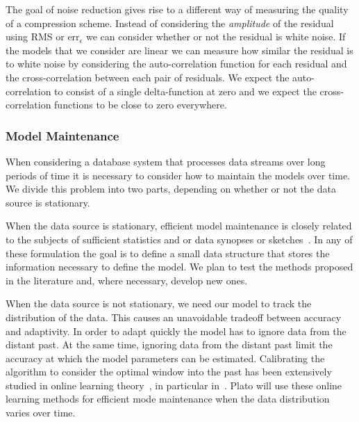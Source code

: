 \iffalse
This is possible when the model used for compression captures some
inherent regularity in the data. Consider a temperature guage in a
room that is taking a measurement ten times per second. Suppose also
that each measurement is the sum of the true temperature and gaussian
noise with a standard deviation of one degree.  It is clear that
replacing blocks of 10 consecutive measurements by their average is
lossy in terms of the original signal. However, at the same time, the
averaged sequence is closer to the true measurements. This noise
reduction relies of the assumption that room temperature rarely
changes significantly within a tenth of a second. Therefor any rapid
variations in the measured temperature is likely to be an artifact of
the sensor rather than anything real.
\fi

The goal of noise reduction gives rise to a different way of measuring
the quality of a compression scheme. Instead of considering the {\em
  amplitude} of the residual using RMS or $\mbox{err}_{\epsilon}$ we
can consider whether or not the residual is white noise. If the models
that we consider are linear we can measure how similar the residual is
to white noise by considering the auto-correlation function for each
residual and the cross-correlation between each pair of residuals. We
expect the auto-correlation to consist of a single delta-function at
zero and we expect the cross-correlation functions to be close to zero
everywhere.

\subsubsection{Model Maintenance}

When considering a database system that processes data streams over
long periods of time it is necessary to consider how to maintain the
models over time. We divide this problem into two parts, depending on
whether or not the data source is stationary.

When the data source is stationary, efficient model maintenance is
closely related to the subjects of sufficient statistics and or data
synopses or sketches~\cite{}. In any of these formulation the goal is
to define a small data structure that stores the information necessary
to define the model. We plan to test the methods proposed in the
literature and, where necessary, develop new ones.

When the data source is not stationary, we need our model to track the
distribution of the data. This causes an unavoidable tradeoff between
accuracy and adaptivity. In order to adapt quickly the model has to
ignore data from the distant past. At the same time, ignoring data
from the distant past limit the accuracy at which the model parameters
can be estimated. Calibrating the algorithm to consider the optimal
window into the past has been extensively studied in online learning
theory~\cite{Cesa-Bianchi}, in particular
in~\cite{HerbsterWarmuth,Specialists,Warmuth bosquet}. Plato will use
these online learning methods for efficient mode maintenance when the
data distribution varies over time.

